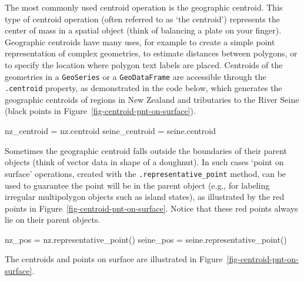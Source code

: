 \documentclass[
  letterpaper,
]{krantz}
\newenvironment{Shaded}{\begin{snugshade}}{\end{snugshade}}
\newcommand{\NormalTok}[1]{\textcolor[rgb]{0.00,0.23,0.31}{#1}}
\newcommand{\OperatorTok}[1]{\textcolor[rgb]{0.37,0.37,0.37}{#1}}
\begin{document}
The most commonly used centroid operation is the geographic centroid.
This type of centroid operation (often referred to as `the centroid')
represents the center of mass in a spatial object (think of balancing a
plate on your finger). Geographic centroids have many uses, for example
to create a simple point representation of complex geometries, to
estimate distances between polygons, or to specify the location where
polygon text labels are placed. Centroids of the geometries in a
\texttt{GeoSeries} or a \texttt{GeoDataFrame} are accessible through the
\texttt{.centroid} property, as demonstrated in the code below, which
generates the geographic centroids of regions in New Zealand and
tributaries to the River Seine (black points in
Figure~\ref{fig-centroid-pnt-on-surface}).

\begin{Shaded}
\begin{Highlighting}[]
\NormalTok{nz\_centroid }\OperatorTok{=}\NormalTok{ nz.centroid}
\NormalTok{seine\_centroid }\OperatorTok{=}\NormalTok{ seine.centroid}
\end{Highlighting}
\end{Shaded}

Sometimes the geographic centroid falls outside the boundaries of their
parent objects (think of vector data in shape of a doughnut). In such
cases `point on surface' operations, created with the
\texttt{.representative\_point} method, can be used to guarantee the
point will be in the parent object (e.g., for labeling irregular
multipolygon objects such as island states), as illustrated by the red
points in Figure~\ref{fig-centroid-pnt-on-surface}. Notice that these
red points always lie on their parent objects.

\begin{Shaded}
\begin{Highlighting}[]
\NormalTok{nz\_pos }\OperatorTok{=}\NormalTok{ nz.representative\_point()}
\NormalTok{seine\_pos }\OperatorTok{=}\NormalTok{ seine.representative\_point()}
\end{Highlighting}
\end{Shaded}

The centroids and points on surface are illustrated in
Figure~\ref{fig-centroid-pnt-on-surface}.
\end{document}
